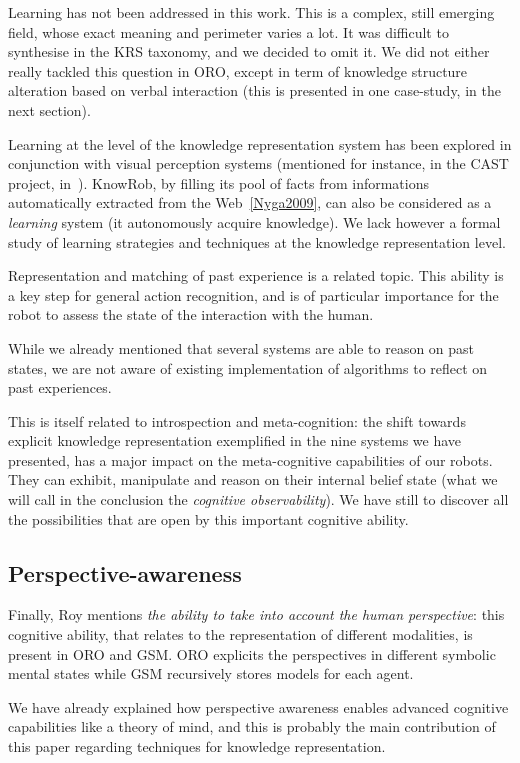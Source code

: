 \documentclass[a4paper, twocolumn]{article}
\begin{document}
Learning has not been addressed in this work. This is a complex, still emerging
field, whose exact meaning and perimeter varies a lot. It was difficult to
synthesise in the KRS taxonomy, and we decided to omit it. We did not either
really tackled this question in ORO, except in term of knowledge structure
alteration based on verbal interaction (this is presented in one case-study, in
the next section).

Learning at the level of the knowledge representation system has been explored
in conjunction with visual perception systems (mentioned for instance, in the
CAST project, in~\cite{Jakobsson2008}). {\sc KnowRob}, by filling its pool of
facts from informations automatically extracted from the Web~\ref{Nyga2009},
can also be considered as a \emph{learning} system (it autonomously acquire
knowledge). We lack however a formal study of learning strategies and
techniques at the knowledge representation level.

Representation and matching of past experience is a related topic. This ability
is a key step for general action recognition, and is of particular importance
for the robot to assess the state of the interaction with the human.

While we already mentioned that several systems are able to reason on past
states, we are not aware of existing implementation of algorithms to reflect on
past experiences.

This is itself related to introspection and meta-cognition: the shift towards
explicit knowledge representation exemplified in the nine systems we have
presented, has a major impact on the meta-cognitive capabilities of our robots.
They can exhibit, manipulate and reason on their internal belief state (what we
will call in the conclusion the \emph{cognitive observability}). We have still
to discover all the possibilities that are open by this important cognitive
ability.

\subsection{Perspective-awareness}

Finally, Roy mentions \emph{the ability to take into account the human
perspective}: this cognitive ability, that relates to the representation of
different modalities, is present in ORO and GSM. ORO explicits the perspectives
in different symbolic mental states while GSM recursively stores models for
each agent.

We have already explained how perspective awareness enables advanced cognitive
capabilities like a theory of mind, and this is probably the main contribution
of this paper regarding techniques for knowledge representation.
\end{document}
